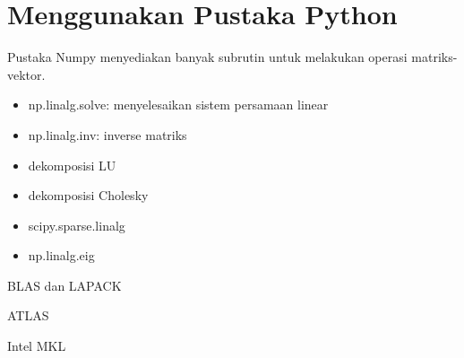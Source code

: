 \section{Menggunakan Pustaka Python}

Pustaka Numpy menyediakan banyak subrutin untuk melakukan operasi matriks-vektor.

\begin{itemize}
\item np.linalg.solve: menyelesaikan sistem persamaan linear
\item np.linalg.inv: inverse matriks
\item dekomposisi LU
\item dekomposisi Cholesky
\item scipy.sparse.linalg
\item np.linalg.eig
\end{itemize}

BLAS dan LAPACK

ATLAS

Intel MKL

